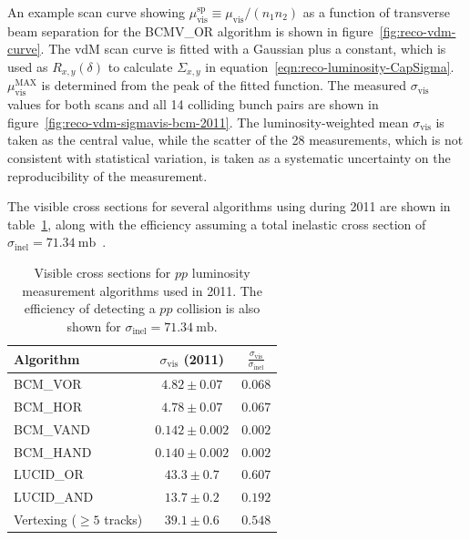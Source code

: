 An example scan curve showing $\mu_{\mathrm{vis}}^{\mathrm{sp}}\equiv \mu_{\mathrm{vis}}/(n_1n_2)$ as a function of transverse beam separation for the BCMV\_OR algorithm is shown in figure~\ref{fig:reco-vdm-curve}. The vdM scan curve is fitted with a Gaussian plus a constant, which is used as $R_{x,y}(\delta)$ to calculate $\Sigma_{x,y}$ in equation~\ref{eqn:reco-luminosity-CapSigma}. $\mu_{\mathrm{vis}}^{\mathrm{MAX}}$ is determined from the peak of the fitted function. The measured $\sigma_{\mathrm{vis}}$ values for both scans and all 14 colliding bunch pairs are shown in figure~\ref{fig:reco-vdm-sigmavis-bcm-2011}. The luminosity-weighted mean $\sigma_{\mathrm{vis}}$ is taken as the central value, while the scatter of the 28 measurements, which is not consistent with statistical variation, is taken as a systematic uncertainty on the reproducibility of the measurement. 

The visible cross sections for several algorithms using during 2011 are shown in table~\ref{table:reco-luminosity-sigmavis-summary}, along with the efficiency assuming a total inelastic cross section of $\sigma_{\mathrm{inel}}= 71.34~\mbox{mb}$~\cite{TheATLASCollaboration:2014jo}.

\begin{table}[htbp]
	\centering
	\begin{tabular}{|l|c|c|}
		\hline
		Algorithm & $\sigma_{\mathrm{vis}}$ (2011) & $\frac{\sigma_{\mathrm{vis}}}{\sigma_{\mathrm{inel}}}$ \\
		\hline
		BCM\_VOR					&	$4.82\pm0.07$	&	$0.068$ \\
		\hline
		BCM\_HOR					&	$4.78\pm0.07$	&	$0.067$ \\
		\hline
		BCM\_VAND					&	$0.142\pm0.002$	&	$0.002$ \\
		\hline
		BCM\_HAND					&	$0.140\pm0.002$	&	$0.002$ \\
		\hline
		LUCID\_OR					&	$43.3\pm0.7$	&	$0.607$ \\
		\hline
		LUCID\_AND					&	$13.7\pm0.2$	&	$0.192$ \\
		\hline
		Vertexing ($\geq5$ tracks)	&	$39.1\pm0.6$	&	$0.548$ \\
		\hline
	\end{tabular}
	\caption{Visible cross sections for $pp$ luminosity measurement algorithms used in 2011. The efficiency of detecting a $pp$ collision is also shown for $\sigma_{\mathrm{inel}}=71.34~\mbox{mb}$.}
	\label{table:reco-luminosity-sigmavis-summary}
\end{table}


